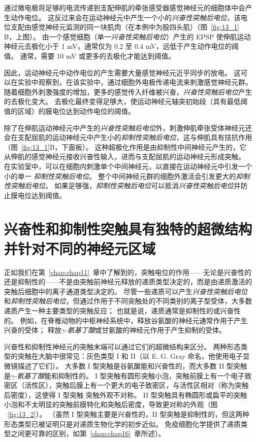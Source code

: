 通过微电极将足够的电流传递到支配伸肌的牵张感受器感觉神经元的细胞体中会产生动作电位。
这反过来会在运动神经元中产生一个小的\textit{兴奋性突触后电位}，该电位支配由感觉神经元监测的同一块肌肉（在本例中为股四头肌）（图~\ref{fig:13_1} B，上图）。
由一个感觉细胞（单一\textit{兴奋性突触后电位}）产生的 EPSP 使伸肌运动神经元去极化小于 1 mV，通常仅为 0.2 至 0.4 mV，远低于产生动作电位的阈值。
通常，需要 10 mV 或更多的去极化才能达到阈值。


因此，运动神经元中动作电位的产生需要大量感觉神经元近乎同步的放电。
这可以在实验中观察到，在该实验中，通过细胞外电极传递电流来刺激感觉神经元群。
随着细胞外刺激强度的增加，更多的感觉传入纤维被兴奋，\textit{兴奋性突触后电位}产生的去极化变大。
去极化最终变得足够大，使运动神经元轴突初始段（具有最低阈值的区域）的膜电位达到动作电位的阈值。


除了在伸肌运动神经元中产生的\textit{兴奋性突触后电位}外，刺激伸肌牵张受体神经元还会在支配屈肌的运动神经元中产生小的\textit{抑制性突触后电位}，这与伸肌具有拮抗作用（图~\ref{fig:13_1}B，下面板）。
这种超极化作用是由抑制性中间神经元产生的，它从伸肌的感觉神经元接收兴奋性输入，进而与支配屈肌的运动神经元形成突触。
在实验室中，可以在细胞内刺激单个中间神经元，以直接在运动神经元中引发一个小的单一 \textit{抑制性突触后电位}。
整个中间神经元群的细胞外激活会引发更大的\textit{抑制性突触后电位}。
如果足够强，\textit{抑制性突触后电位}可以抵消\textit{兴奋性突触后电位}并防止膜电位达到阈值。



\section{兴奋性和抑制性突触具有独特的超微结构并针对不同的神经元区域}

正如我们在第~\ref{chap:chap11}~章中了解到的，突触电位的作用——无论是兴奋性的还是抑制性的——不是由突触前神经元释放的递质类型决定的，而是由递质激活的突触后细胞中的离子通道类型决定的。
尽管一些递质可以产生\textit{兴奋性突触后电位}和\textit{抑制性突触后电位}，但通过作用于不同突触处的不同类别的离子型受体，大多数递质产生一种主要类型的突触反应；
也就是说，递质通常是抑制性的或兴奋性的。
例如，在脊椎动物的中枢神经系统中，释放谷氨酸的神经元通常作用于产生兴奋的受体；
释放\textit{$\gamma$-氨基丁酸}或甘氨酸的神经元作用于产生抑制的受体。


兴奋性和抑制性神经元的突触末端可以通过它们的超微结构来区分。
两种形态类型的突触在大脑中很常见：灰色类型 I 和 II（以 E. G. Gray 命名，他使用电子显微镜描述了它们）。
大多数 I 型突触是谷氨酸能和兴奋性的，而大多数 II 型突触是\textit{$\gamma$-氨基丁酸}能和抑制性的。
I 型突触有圆形突触小泡，突触前膜上有一个电子致密区（活性区），突触后膜上有一个更大的电子致密区，与活性区相对（称为突触后密度），这使得 I 型突触 突触外观不对称。 
II 型突触具有椭圆形或扁平的突触小泡和不太明显的突触前膜特化和突触后密度，导致更对称的外观（图 ~\ref{fig:13_2}）。 
（虽然 I 型突触主要是兴奋性的，II 型突触是抑制性的，但这两种形态类型已被证明只是对递质生物化学的初步近似。
免疫细胞化学提供了递质类型之间更可靠的区别，如第~\ref{chap:chap16}~章所述）。


